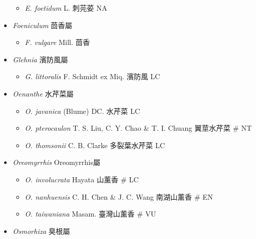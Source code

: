 \begin{itemize}
  \begin{itemize}
        \item[] \textit{E. foetidum} L.  刺芫荽   NA
  \end{itemize}
 \item[] \textit{Foeniculum} 茴香屬
                                
  \begin{itemize}
        \item[] \textit{F. vulgare} Mill.  茴香   
  \end{itemize}
 \item[] \textit{Glehnia} 濱防風屬
                                
  \begin{itemize}
        \item[] \textit{G. littoralis} F. Schmidt ex Miq.  濱防風   LC
  \end{itemize}
 \item[] \textit{Oenanthe} 水芹菜屬
                                
  \begin{itemize}
        \item[] \textit{O. javanica} (Blume) DC.  水芹菜   LC
        \item[] \textit{O. pterocaulon} T. S. Liu, C. Y. Chao \& T. I. Chuang  翼莖水芹菜  \# NT
        \item[] \textit{O. thomsonii} C. B. Clarke  多裂葉水芹菜   LC
  \end{itemize}
 \item[] \textit{Oreomyrrhis} Oreomyrrhis屬
                                
  \begin{itemize}
        \item[] \textit{O. involucrata} Hayata  山薰香  \# LC
        \item[] \textit{O. nanhuensis} C. H. Chen \& J. C. Wang  南湖山薰香  \# EN
        \item[] \textit{O. taiwaniana} Masam.  臺灣山薰香  \# VU
  \end{itemize}
 \item[] \textit{Osmorhiza} 臭根屬
                                

\end{itemize}
